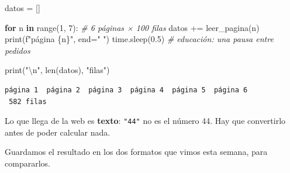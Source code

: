 \documentclass[
]{article}
\newenvironment{Shaded}{}{}
\newcommand{\BuiltInTok}[1]{\textcolor[rgb]{0.00,0.50,0.00}{#1}}
\newcommand{\CharTok}[1]{\textcolor[rgb]{0.25,0.44,0.63}{#1}}
\newcommand{\CommentTok}[1]{\textcolor[rgb]{0.38,0.63,0.69}{\textit{#1}}}
\newcommand{\ControlFlowTok}[1]{\textcolor[rgb]{0.00,0.44,0.13}{\textbf{#1}}}
\newcommand{\DecValTok}[1]{\textcolor[rgb]{0.25,0.63,0.44}{#1}}
\newcommand{\FloatTok}[1]{\textcolor[rgb]{0.25,0.63,0.44}{#1}}
\newcommand{\KeywordTok}[1]{\textcolor[rgb]{0.00,0.44,0.13}{\textbf{#1}}}
\newcommand{\NormalTok}[1]{#1}
\newcommand{\OperatorTok}[1]{\textcolor[rgb]{0.40,0.40,0.40}{#1}}
\newcommand{\SpecialCharTok}[1]{\textcolor[rgb]{0.25,0.44,0.63}{#1}}
\newcommand{\SpecialStringTok}[1]{\textcolor[rgb]{0.73,0.40,0.53}{#1}}
\newcommand{\StringTok}[1]{\textcolor[rgb]{0.25,0.44,0.63}{#1}}
\begin{document}
\protect{}\label{2c8affdc}
\begin{Shaded}
\begin{Highlighting}[]
\NormalTok{datos }\OperatorTok{=}\NormalTok{ []}

\ControlFlowTok{for}\NormalTok{ n }\KeywordTok{in} \BuiltInTok{range}\NormalTok{(}\DecValTok{1}\NormalTok{, }\DecValTok{7}\NormalTok{):            }\CommentTok{\# 6 páginas × 100 filas}
\NormalTok{    datos }\OperatorTok{+=}\NormalTok{ leer\_pagina(n)}
    \BuiltInTok{print}\NormalTok{(}\SpecialStringTok{f"página }\SpecialCharTok{\{}\NormalTok{n}\SpecialCharTok{\}}\SpecialStringTok{"}\NormalTok{, end}\OperatorTok{=}\StringTok{"  "}\NormalTok{)}
\NormalTok{    time.sleep(}\FloatTok{0.5}\NormalTok{)              }\CommentTok{\# educación: una pausa entre pedidos}

\BuiltInTok{print}\NormalTok{(}\StringTok{"}\CharTok{\textbackslash{}n}\StringTok{"}\NormalTok{, }\BuiltInTok{len}\NormalTok{(datos), }\StringTok{"filas"}\NormalTok{)}
\end{Highlighting}
\end{Shaded}

\begin{verbatim}
página 1  página 2  página 3  página 4  página 5  página 6  
 582 filas
\end{verbatim}

\protect{}\label{3fa2baa4}
Lo que llega de la web es \textbf{texto}: \texttt{"44"} no es el número
44. Hay que convertirlo antes de poder calcular nada.

Guardamos el resultado en los dos formatos que vimos esta semana, para
compararlos.
\end{document}
